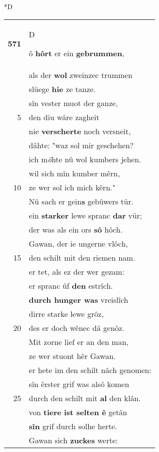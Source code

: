 \documentclass[8pt,a4paper,notitlepage]{article}
\begin{document}
\begin{table}[ht]
\begin{minipage}[t]{0.5\linewidth}
\small
\begin{center}*D
\end{center}
\begin{tabular}{rl}
\textbf{571} & \begin{large}D\end{large}ô \textbf{hôrt} er ein \textbf{gebrummen},\\ 
 & als der \textbf{wol} zweinzec trummen\\ 
 & slüege \textbf{hie} ze tanze.\\ 
 & sîn vester muot der ganze,\\ 
5 & den diu wâre zagheit\\ 
 & nie \textbf{verscherte} noch versneit,\\ 
 & dâhte: "waz sol mir geschehen?\\ 
 & ich m\textit{ö}hte nû wol kumbers jehen.\\ 
 & wil sich mîn kumber mêrn,\\ 
10 & ze wer sol ich mich kêrn."\\ 
 & Nû sach er gein\textbf{s} gebûwers tür.\\ 
 & ein \textbf{starker} lewe spranc \textbf{dar} vür;\\ 
 & der was als ein ors \textbf{sô} hôch.\\ 
 & Gawan, der ie ungerne vlôch,\\ 
15 & den schilt mit den riemen nam.\\ 
 & er tet, als ez der wer gezam:\\ 
 & er spranc ûf \textbf{den} estrîch.\\ 
 & \textbf{durch hunger was} vreislîch\\ 
 & dirre starke lewe grôz,\\ 
20 & des er doch wênec dâ genôz.\\ 
 & Mit zorne lief er an den man,\\ 
 & ze wer stuont hêr Gawan.\\ 
 & er hete im den schilt nâch genomen:\\ 
 & sîn êrster grif was alsô komen\\ 
25 & durch den schilt mit \textbf{al} den klân.\\ 
 & von \textbf{tiere} \textbf{ist selten ê} getân\\ 
 & \textbf{sîn} grif durch solhe herte.\\ 
 & Gawan sich \textbf{zuckes} werte:\\ 

\end{tabular}
\end{minipage}
\end{table}
\end{document}
